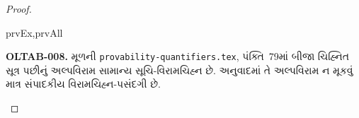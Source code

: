 \documentclass[../../../include/open-logic-section]{subfiles}
\begin{document}
\begin{proof}
\begin{tagenumerate}{prvEx,prvAll}
\end{tagenumerate}
\begin{editorial}
\textbf{OLTAB-008.} મૂળની \texttt{provability-quantifiers.tex}, પંક્તિ~79માં બીજા ચિહ્નિત સૂત્ર પછીનું અલ્પવિરામ સામાન્ય સૂચિ-વિરામચિહ્ન છે. અનુવાદમાં તે અલ્પવિરામ ન મૂકવું માત્ર સંપાદકીય વિરામચિહ્ન-પસંદગી છે.
\end{editorial}
\end{proof}
\end{document}
